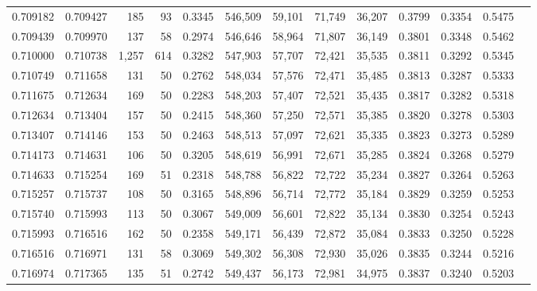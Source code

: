 \begin{tabular}{rrrrrrrrrrrrr}
0.709182 & 0.709427 &   185 &  93 &                                     0.3345 & 546,509 &  59,101 &  71,749 &  36,207 & 0.3799 & 0.3354 & 0.5475 \\
0.709439 & 0.709970 &   137 &  58 &                                     0.2974 & 546,646 &  58,964 &  71,807 &  36,149 & 0.3801 & 0.3348 & 0.5462 \\
0.710000 & 0.710738 & 1,257 & 614 &                                     0.3282 & 547,903 &  57,707 &  72,421 &  35,535 & 0.3811 & 0.3292 & 0.5345 \\
0.710749 & 0.711658 &   131 &  50 &                                     0.2762 & 548,034 &  57,576 &  72,471 &  35,485 & 0.3813 & 0.3287 & 0.5333 \\
0.711675 & 0.712634 &   169 &  50 &                                     0.2283 & 548,203 &  57,407 &  72,521 &  35,435 & 0.3817 & 0.3282 & 0.5318 \\
0.712634 & 0.713404 &   157 &  50 &                                     0.2415 & 548,360 &  57,250 &  72,571 &  35,385 & 0.3820 & 0.3278 & 0.5303 \\
0.713407 & 0.714146 &   153 &  50 &                                     0.2463 & 548,513 &  57,097 &  72,621 &  35,335 & 0.3823 & 0.3273 & 0.5289 \\
0.714173 & 0.714631 &   106 &  50 &                                     0.3205 & 548,619 &  56,991 &  72,671 &  35,285 & 0.3824 & 0.3268 & 0.5279 \\
0.714633 & 0.715254 &   169 &  51 &                                     0.2318 & 548,788 &  56,822 &  72,722 &  35,234 & 0.3827 & 0.3264 & 0.5263 \\
0.715257 & 0.715737 &   108 &  50 &                                     0.3165 & 548,896 &  56,714 &  72,772 &  35,184 & 0.3829 & 0.3259 & 0.5253 \\
0.715740 & 0.715993 &   113 &  50 &                                     0.3067 & 549,009 &  56,601 &  72,822 &  35,134 & 0.3830 & 0.3254 & 0.5243 \\
0.715993 & 0.716516 &   162 &  50 &                                     0.2358 & 549,171 &  56,439 &  72,872 &  35,084 & 0.3833 & 0.3250 & 0.5228 \\
0.716516 & 0.716971 &   131 &  58 &                                     0.3069 & 549,302 &  56,308 &  72,930 &  35,026 & 0.3835 & 0.3244 & 0.5216 \\
0.716974 & 0.717365 &   135 &  51 &                                     0.2742 & 549,437 &  56,173 &  72,981 &  34,975 & 0.3837 & 0.3240 & 0.5203 \\

\end{tabular}
